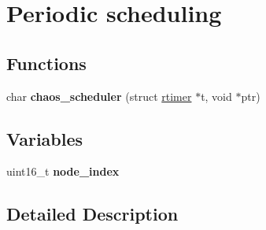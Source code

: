 \hypertarget{group__chaos-test-scheduler}{\section{Periodic scheduling}
\label{group__chaos-test-scheduler}
}
\subsection*{Functions}
\begin{DoxyCompactItemize}
\item 
\hypertarget{group__chaos-test-scheduler_ga321695acf99f30cdff7c24589a573052}{char {\bfseries chaos\-\_\-scheduler} (struct \hyperlink{structrtimer}{rtimer} $\ast$t, void $\ast$ptr)}\label{group__chaos-test-scheduler_ga321695acf99f30cdff7c24589a573052}

\end{DoxyCompactItemize}
\subsection*{Variables}
\begin{DoxyCompactItemize}
\item 
\hypertarget{group__chaos-test-scheduler_gad10cfcf615471ef84ddb45e687aabf11}{uint16\-\_\-t {\bfseries node\-\_\-index}}\label{group__chaos-test-scheduler_gad10cfcf615471ef84ddb45e687aabf11}

\end{DoxyCompactItemize}


\subsection{Detailed Description}
